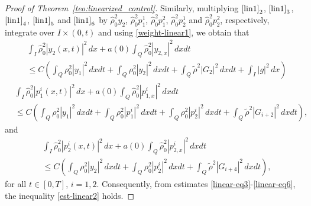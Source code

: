 \documentclass[11pt,a4paper]{amsart}
\numberwithin{equation}{section}
\begin{document}
\begin{proof}[Proof of Theorem~\ref{teo:linearized_control}]
\noindent Similarly, multiplying $\eqref{lin1}_{2}$, $\eqref{lin1}_{3}$, $\eqref{lin1}_{4}$, $\eqref{lin1}_{5}$ and $\eqref{lin1}_{6}$      by $\hat{\rho}^{2}_{0}y_{2}$, $\hat{\rho}^{2}_{0}p^{1}_{1}$, $\hat{\rho}^{2}_{0}p^{2}_{1}$, $\hat{\rho}^{2}_{0}p^{1}_{2}$ and $\hat{\rho}^{2}_{0}p^{2}_{2}$, respectively,  integrate over  $I\times (0, t)$ and using \eqref{weight-linear1},    we obtain that
\begin{equation}\label{linear-eq4}
\begin{split}
&\int_{I}\hat{\rho}^{2}_{0}|y_{2}(x,t)|^{2}\,dx+a(0)\int_{Q}\hat{\rho}^{2}_{0}|y_{2,x}|^{2}\,dxdt \\
&\leq  C\left(   \int_{Q}\rho^{2}_{0}|y_{1}|^{2}\,dxdt+\int_{Q}\rho^{2}_{0}|y_{2}|^{2}\,dxdt +\int_{Q}\tilde{\rho}^{2}|G_{2}|^{2}\,dxdt+\int_{I}|g|^{2}\,dx \right)
\end{split}
\end{equation}
\begin{equation}\label{linear-eq5}
\begin{split}
&\int_{I}\hat{\rho}^{2}_{0}|p^{i}_{1}(x,t)|^{2}\,dx+a(0)\int_{Q}\hat{\rho}^{2}_{0}|p^{i}_{1,x}|^{2}\,dxdt\\
&\leq C\left(  \int_{Q}\rho^{2}_{0}|y_{1}|^{2}\,dxdt+ \int_{Q}\rho^{2}_{0}|p^{i}_{1}|^{2}\,dxdt  +\int_{Q}\rho^{2}_{0}|p^{i}_{2}|^{2}\,dxdt+\int_{Q}\tilde{\rho}^{2}|G_{i+2}|^{2}\,dxdt\right), 
\end{split}
\end{equation}and 
\begin{equation}\label{linear-eq6}
\begin{split}
  & \int_{I}\hat{\rho}^{2}_{0}|p^{i}_{2}(x,t)|^{2}\,dx+a(0)\int_{Q}\hat{\rho}^{2}_{0}|p^{i}_{2,x}|^{2}\,dxdt\\
  &\leq C\left(  \int_{Q}\rho^{2}_{0}|y_{2}|^{2}\,dxdt +\int_{Q}\rho^{2}_{0}|p^{i}_{2}|^{2}\,dxdt+\int_{Q}\tilde{\rho}^{2}|G_{i+4}|^{2}\,dxdt\right),
\end{split}
\end{equation}for all $t \in [0, T]$,  $i=1,2.$ Consequently, from estimates \eqref{linear-eq3}-\eqref{linear-eq6}, the inequality \eqref{est-linear2} holds.


\end{proof}
\end{document}
